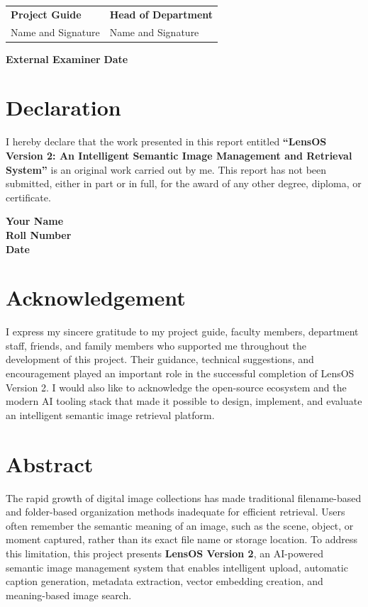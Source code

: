 \documentclass[12pt,a4paper]{report}
\begin{document}
\vspace{2cm}
\noindent
\begin{tabularx}{\textwidth}{X X}
\textbf{Project Guide} & \textbf{Head of Department} \\
Name and Signature & Name and Signature \\
\end{tabularx}

\vspace{2cm}
\noindent
\textbf{External Examiner} \hfill \textbf{Date}

\chapter*{Declaration}
I hereby declare that the work presented in this report entitled \textbf{``LensOS Version 2: An Intelligent Semantic Image Management and Retrieval System''} is an original work carried out by me. This report has not been submitted, either in part or in full, for the award of any other degree, diploma, or certificate.

\vspace{2cm}
\noindent
\textbf{Your Name}\\
\textbf{Roll Number}\\
\textbf{Date}

\chapter*{Acknowledgement}
I express my sincere gratitude to my project guide, faculty members, department staff, friends, and family members who supported me throughout the development of this project. Their guidance, technical suggestions, and encouragement played an important role in the successful completion of LensOS Version 2. I would also like to acknowledge the open-source ecosystem and the modern AI tooling stack that made it possible to design, implement, and evaluate an intelligent semantic image retrieval platform.

\chapter*{Abstract}
The rapid growth of digital image collections has made traditional filename-based and folder-based organization methods inadequate for efficient retrieval. Users often remember the semantic meaning of an image, such as the scene, object, or moment captured, rather than its exact file name or storage location. To address this limitation, this project presents \textbf{LensOS Version 2}, an AI-powered semantic image management system that enables intelligent upload, automatic caption generation, metadata extraction, vector embedding creation, and meaning-based image search.
\end{document}

